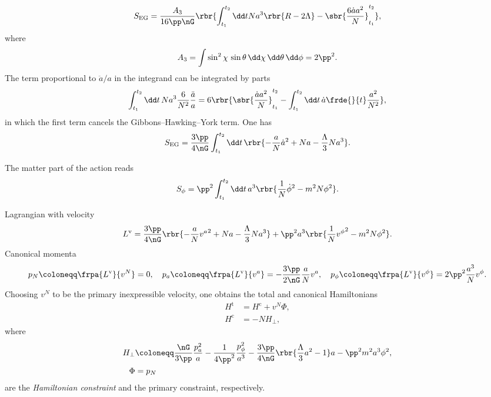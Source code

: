 \documentclass[a4paper,11pt]{article}
\begin{document}
\begin{equation}
S_\text{EG} = \frac{A_3}{16\pp\nG} \rbr{\int_{t_1}^{t_2} \dd t
Na^3\rbr{R - 2\Lambda} - \sbr{\frac{6\dot{a}a^2}{N}}_{t_1}^{t_2}},
\end{equation}
where
\begin{equation}
A_3 = \int \sin^2\chi\,\sin\theta\,\dd\chi\,\dd\theta\,\dd\phi = 2\pp^2.
\end{equation}
The term proportional to $\ddot{a}/a$ in the integrand can be integrated by
parts
\begin{equation}
\int_{t_1}^{t_2} \dd t\,Na^3 \frac{6}{N^2} \frac{\ddot{a}}{a}
= 6\rbr{\sbr{\frac{\dot{a}a^2}{N}}_{t_1}^{t_2} - \int_{t_1}^{t_2}\dd t
\,\dot{a}\frde{}{t}\frac{a^2}{N^2}},
\end{equation}
in which the first term cancels the Gibbons--Hawking--York term. One has
\begin{equation}
S_\text{EG} = \frac{3\pp}{4\nG}\int_{t_1}^{t_2} \dd t\,
\rbr{-\frac{a}{N}\dot{a}^2 + N a - \frac{\Lambda}{3}N a^3}.
\end{equation}

The matter part of the action reads
\begin{equation}
S_\phi = \pp^2 \int_{t_1}^{t_2}\dd t\,
a^3 \rbr{\frac{1}{N}\dot{\phi}^2 - m^2N\phi^2}.
\end{equation}

Lagrangian with velocity
\begin{equation}
L^\text{v} = \frac{3\pp}{4\nG}\rbr{-\frac{a}{N} {v^a}^2 + Na - 
\frac{\Lambda}{3} Na^3} + \pp^2 a^3 \rbr{\frac{1}{N}{v^\phi}^2 - m^2 N 
\phi^2}.
\end{equation}
Canonical momenta
\begin{equation}
p_N \coloneqq \frpa{L^\text{v}}{v^N} = 0,\quad
p_a \coloneqq \frpa{L^\text{v}}{v^a} = -\frac{3\pp}{2\nG} \frac{a}{N} v^a,\quad
p_\phi \coloneqq \frpa{L^\text{v}}{v^\phi} = 2\pp^2 \frac{a^3}{N} v^\phi.
\end{equation}
Choosing $v^N$ to be the primary inexpressible velocity, one obtains the total 
and canonical Hamiltonians
\begin{align}
H^\text{t} &= H^\text{c} + v^N \Phi, \\
H^\text{c} &= -N H_\perp,
\end{align}
where
\begin{align}
H_\perp &\coloneqq \frac{\nG}{3\pp} \frac{p_a^2}{a}  - \frac{1}{4\pp^2} 
\frac{p_\phi^2}{a^3}  - \frac{3\pp}{4\nG}\rbr{\frac{\Lambda}{3}a^2 - 1}a
- \pp^2 m^2 a^3 \phi^2, \\
\Phi &= p_N
\end{align}
are the \emph{Hamiltonian constraint} and the primary constraint, respectively.
\end{document}
